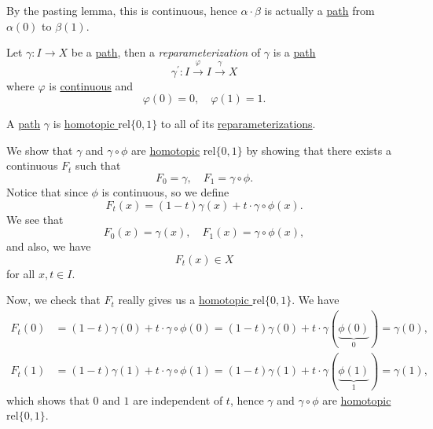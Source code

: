 \begin{remark}
	By the pasting lemma, this is continuous, hence \(\alpha \cdot \beta \) is actually a \hyperref[def:path]{path} from \(\alpha (0)\) to \(\beta (1)\).
\end{remark}

\begin{definition}[Reparameterization]\label{def:reparameterization}
	Let \(\gamma\colon I\to X\) be a \hyperref[def:path]{path}, then a \emph{reparameterization} of \(\gamma\) is a \hyperref[def:path]{path}
	\[
		\gamma ^\prime \colon I\overset{\varphi }{\longrightarrow} I\overset{\gamma}{\longrightarrow} X
	\]
	where \(\varphi \) is \underline{continuous} and
	\[
		\varphi (0) = 0,\quad \varphi (1) = 1.
	\]
\end{definition}

\begin{exercise}
	A \hyperref[def:path]{path} \(\gamma\) is \hyperref[def:homotopy-relative]{homotopic \(\mathrm{rel} \{0, 1\}\)} to all of its
	\hyperref[def:reparameterization]{reparameterizations}.
\end{exercise}
\begin{answer}
	\par We show that \(\gamma\) and \(\gamma\circ \phi \) are \hyperref[def:homotopic]{homotopic} \(\mathrm{rel} \{0, 1\}\) by showing that
	there exists a continuous \(F_t\) such that
	\[
		F_0 = \gamma,\quad F_1 = \gamma\circ \phi.
	\]
	Notice that since \(\phi \) is continuous, so we define
	\[
		F_t(x) = (1 - t) \gamma(x) + t\cdot \gamma\circ \phi (x).
	\]
	We see that
	\[
		F_0(x) = \gamma(x),\quad F_1(x) = \gamma\circ \phi (x),
	\]
	and also, we have
	\[
		F_t(x)\in X
	\]
	for all \(x, t\in I\).

	\par Now, we check that \(F_t\) really gives us a \hyperref[def:homotopy-relative]{homotopic \(\mathrm{rel} \{0, 1\}\)}. We have
	\[
		\begin{split}
			F_t(0) &= (1 - t)\gamma(0) + t\cdot \gamma\circ \phi (0) = (1 - t)\gamma(0) + t\cdot \gamma(\underbrace{\phi (0)}_{0}) = \gamma(0),\\
			F_t(1) &= (1 - t)\gamma(1) + t\cdot \gamma\circ \phi (1) = (1 - t)\gamma(1) + t\cdot \gamma(\underbrace{\phi (1)}_{1}) = \gamma(1),
		\end{split}
	\]
	which shows that \(0\) and \(1\) are independent of \(t\), hence \(\gamma\) and \(\gamma\circ \phi \) are \hyperref[def:homotopy-relative]{homotopic \(\mathrm{rel} \{0, 1\}\)}.
\end{answer}

